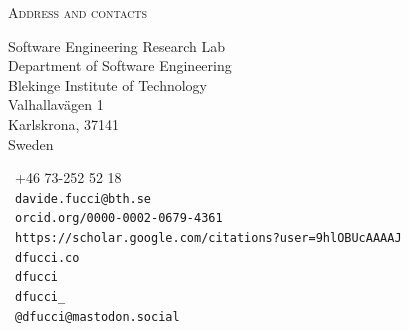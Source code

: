 \documentclass[9pt]{article}
\makeatletter
\def\myemail{davide.fucci@bth.se}
\def\myphone{+46 73-252 52 18}
\def\mymastodon{@dfucci@mastodon.social}
\def\mypublons{publons.com/a/930114/}
\def\mygscholar{https://scholar.google.com/citations?user=9hlOBUcAAAAJ}
\def\myorcid{orcid.org/0000-0002-0679-4361}
\makeatother
\begin{document}
  \textheight=580pt
  \raggedbottom
  \thispagestyle{fancy}


  \reversemarginpar
  \noindent\textsc{Address and contacts}\\
    \begin{minipage}[t]{2in}
{\footnotesize Software Engineering Research Lab\vspace{-0.04in}\\
  \noindent Department of Software Engineering \vspace{-0.04in}\\
    \noindent Blekinge Institute of Technology \vspace{-0.01in}\\
    \noindent Valhallavägen 1 \vspace{-0.04in}\\
    \noindent Karlskrona, 37141 \vspace{-0.04in}\\
    \noindent Sweden
}
\end{minipage}
\begin{minipage}[t]{1.7in}
{\footnotesize \faPhone~\myphone \\
  \noindent \faEnvelope~\texttt{\myemail}\vspace{-0.03in}\\
    \noindent \aiOrcid~\texttt{\myorcid} \vspace{-0.03in}\\
    \noindent \aiGoogleScholar~\texttt{\mygscholar} \vspace{-0.20in}\\
    \noindent \faSitemap~\texttt{dfucci.co} \vspace{-0.03in}\\
    \noindent \faGithub~\texttt{dfucci} \vspace{-0.03in}\\
    \noindent  \faTwitter~\texttt{dfucci\_}\vspace{-0.03in}\\
    \noindent  \faMastodon~\texttt{\mymastodon}
}
\end{minipage}
\end{document}
